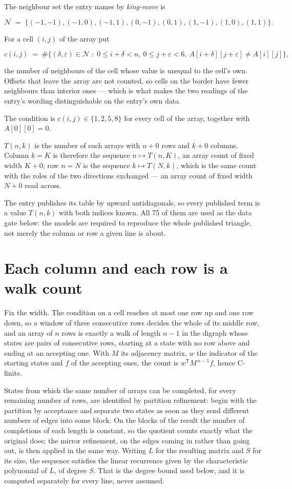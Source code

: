 \documentclass[11pt]{article}
\theoremstyle{definition}
\begin{document}
The neighbour set the entry names by {\itshape king-move} is

\[\mathcal{N} \;=\; \{(-1,-1), (-1,0), (-1,1), (0,-1), (0,1), (1,-1), (1,0), (1,1)\}.\]

For a cell $(i,j)$ of the array put

\[c(i,j) \;=\; \#\bigl\{(\delta,\varepsilon)\in\mathcal{N} \;:\; 0\le i+\delta<n,\ 0\le j+\varepsilon<6,\ A[i+\delta][j+\varepsilon] \neq A[i][j]\bigr\},\]

the number of neighbours of the cell whose value is unequal to the cell's own. Offsets that leave the array are not counted, so cells on the border have fewer neighbours than interior ones --- which is what makes the two readings of the entry's wording distinguishable on the entry's own data.

The condition is $c(i,j) \in \{1, 2, 5, 8\}$ for every cell of the array, together with $A[0][0]=0$.

$T(n,k)$ is the number of such arrays with $n + 0$ rows and $k + 0$ columns. Column $k = K$ is therefore the sequence $n \mapsto T(n,K)$, an array count of fixed width $K + 0$; row $n = N$ is the sequence $k \mapsto T(N,k)$, which is the same count with the roles of the two directions exchanged --- an array count of fixed width $N + 0$ read across.

The entry publishes its table by upward antidiagonals, so every published term is a value $T(n,k)$ with both indices known. All 75 of them are used as the data gate below: the models are required to reproduce the whole published triangle, not merely the column or row a given line is about.

\section{Each column and each row is a walk count}

Fix the width. The condition on a cell reaches at most one row up and one row down, so a window of three consecutive rows decides the whole of its middle row, and an array of $n$ rows is exactly a walk of length $n-1$ in the digraph whose states are pairs of consecutive rows, starting at a state with no row above and ending at an accepting one. With $M$ its adjacency matrix, $w$ the indicator of the starting states and $f$ of the accepting ones, the count is $w^{\mathsf T}M^{\,n-1}f$, hence C-finite.

States from which the same number of arrays can be completed, for every remaining number of rows, are identified by partition refinement: begin with the partition by acceptance and separate two states as soon as they send different numbers of edges into some block. On the blocks of the result the number of completions of each length is constant, so the quotient counts exactly what the original does; the mirror refinement, on the edges coming in rather than going out, is then applied in the same way. Writing $L$ for the resulting matrix and $S$ for its size, the sequence satisfies the linear recurrence given by the characteristic polynomial of $L$, of degree $S$. That is the degree bound used below, and it is computed separately for every line, never assumed.
\end{document}
